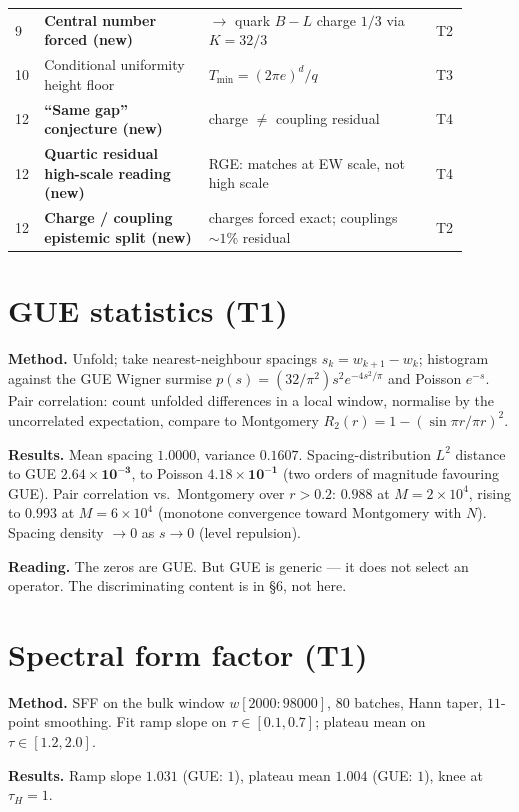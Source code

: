 \documentclass[11pt]{article}
\begin{document}
\begin{center}
\begin{longtable}{@{}p{0.04\linewidth}p{0.34\linewidth}p{0.47\linewidth}p{0.05\linewidth}@{}}
9 & \textbf{Central number forced (new)} & $\to$ quark $B\!-\!L$ charge $1/3$ via $K=32/3$ & T2 \\
10 & Conditional uniformity height floor & $T_{\min}=(2\pi e)^d/q$ & T3 \\
12 & \textbf{``Same gap'' conjecture (new)} & charge $\neq$ coupling residual & T4 \\
12 & \textbf{Quartic residual high-scale reading (new)} & RGE: matches at EW scale, not high scale & T4 \\
12 & \textbf{Charge / coupling epistemic split (new)} & charges forced exact; couplings $\sim1\%$ residual & T2 \\
\bottomrule
\end{longtable}
\end{center}

\section{GUE statistics (T1)}

\textbf{Method.} Unfold; take nearest-neighbour spacings $s_k=w_{k+1}-w_k$; histogram against the GUE Wigner surmise $p(s)=(32/\pi^2)s^2e^{-4s^2/\pi}$ and Poisson $e^{-s}$. Pair correlation: count unfolded differences in a local window, normalise by the uncorrelated expectation, compare to Montgomery $R_2(r)=1-(\sin\pi r/\pi r)^2$.

\textbf{Results.} Mean spacing $1.0000$, variance $0.1607$. Spacing-distribution $L^2$ distance to GUE $\mathbf{2.64\times10^{-3}}$, to Poisson $\mathbf{4.18\times10^{-1}}$ (two orders of magnitude favouring GUE). Pair correlation vs.\ Montgomery over $r>0.2$: $\mathbf{0.988}$ at $M{=}2{\times}10^4$, rising to $\mathbf{0.993}$ at $M{=}6{\times}10^4$ (monotone convergence toward Montgomery with $N$). Spacing density $\to0$ as $s\to0$ (level repulsion).

\textbf{Reading.} The zeros are GUE. But GUE is generic --- it does not select an operator. The discriminating content is in \S6, not here.

\section{Spectral form factor (T1)}

\textbf{Method.} SFF on the bulk window $w[2000:98000]$, $80$ batches, Hann taper, $11$-point smoothing. Fit ramp slope on $\tau\in[0.1,0.7]$; plateau mean on $\tau\in[1.2,2.0]$.

\textbf{Results.} Ramp slope $\mathbf{1.031}$ (GUE: $1$), plateau mean $\mathbf{1.004}$ (GUE: $1$), knee at $\tau_H=1$.
\end{document}
